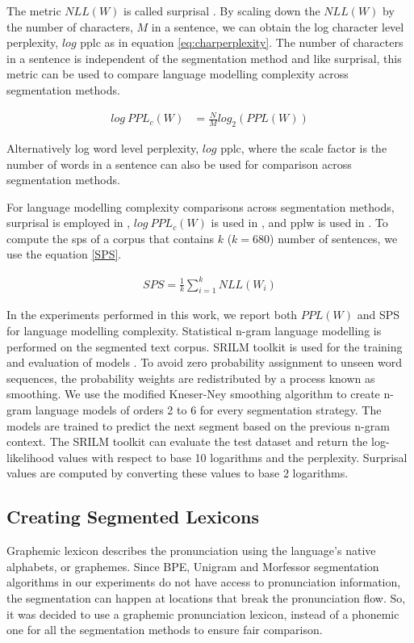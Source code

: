 The metric $NLL(W)$ is called surprisal \cite{10.1162/tacl00365}. By scaling
down the $NLL(W)$ by the number of characters, $M$ in a sentence, we can obtain
the log character level perplexity, $log$  \gls{pplc} as in equation
\ref{eq:charperplexity}. 
The number of characters in a sentence is independent
of the segmentation method and like surprisal, this metric can be used to
compare language modelling complexity across segmentation methods.

\begin{align}
    log\ PPL_c(W) & = \frac{N}{M} log_2 (PPL(W))
    \label{eq:charperplexity}
\end{align}

Alternatively log word level perplexity, $log$ \gls{pplc}, where the scale
factor is the number of words in a sentence can also be used for comparison
across segmentation methods.


For language modelling complexity comparisons across segmentation methods,
surprisal is employed in
\cite{10.1162/tacl00365}, $log\ PPL_c(W)$ is used in \cite{Mousa1995},  and \gls{pplw} is used in \cite{SMIT2021101158}. To
compute the \gls{sps} of a corpus that contains $k$
($k=680$) number of sentences, we use the equation \ref{SPS}.

\begin{align}
    SPS = \frac{1}{k} \sum_{i=1}^{k} NLL(W_i)
    \label{SPS}
\end{align}

In the experiments performed in this work, we report both $PPL(W)$ and SPS for
language modelling complexity. Statistical n-gram language modelling is
performed on the segmented text corpus. SRILM toolkit is used for the training
and evaluation of models \cite{stolcke2002srilm}. To avoid zero probability
assignment to unseen word sequences, the probability weights are redistributed
by a process known as smoothing. We use the modified Kneser-Ney smoothing
algorithm \cite{Kneysmoothing1995} to create n-gram language models of orders 2
to 6 for every segmentation strategy. The models are trained to predict the
next segment based on the previous n-gram context. The SRILM toolkit can
evaluate the test dataset and return the log-likelihood values with respect to
base 10 logarithms and the perplexity. Surprisal values are computed by
converting these values to base 2 logarithms.

\subsection{Creating Segmented Lexicons}
\label{sec:ch-openvocab-graphemiclexicon}
Graphemic lexicon describes the pronunciation using the language's native alphabets, or graphemes. Since BPE, Unigram and Morfessor segmentation algorithms in our experiments do not have access to pronunciation information, the segmentation can happen at locations that break the pronunciation flow. So, it was decided to use a graphemic pronunciation lexicon, instead of a phonemic one \cite{SMIT2021101158} for all the segmentation methods to ensure fair comparison.

